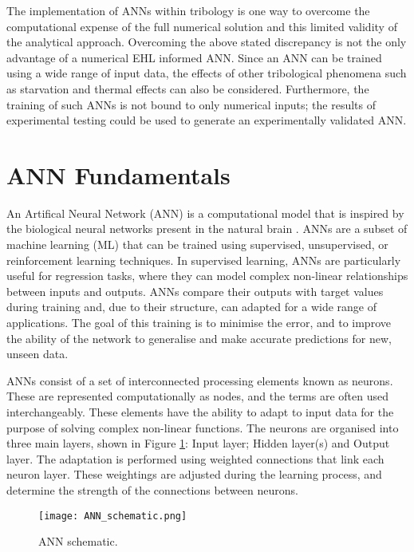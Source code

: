 The implementation of ANNs within tribology is one way to overcome the computational expense of the full numerical solution and this limited validity of the analytical approach. Overcoming the above stated discrepancy is not the only advantage of a numerical EHL informed ANN. Since an ANN can be trained using a wide range of input data, the effects of other tribological phenomena such as starvation and thermal effects can also be considered. Furthermore, the training of such ANNs is not bound to only numerical inputs; the results of experimental testing could be used to generate an experimentally validated ANN.

\section{ANN Fundamentals}

An Artifical Neural Network (ANN) is a computational model that is inspired by the biological neural networks present in the natural brain \cite{Sarkar2017}. ANNs are a subset of machine learning (ML) that can be trained using supervised, unsupervised, or reinforcement learning techniques. In supervised learning, ANNs are particularly useful for regression tasks, where they can model complex non-linear relationships between inputs and outputs. ANNs compare their outputs with target values during training and, due to their structure, can adapted for a wide range of applications. The goal of this training is to minimise the error, and to improve the ability of the network to generalise and make accurate predictions for new, unseen data.

ANNs consist of a set of interconnected processing elements known as neurons. These are represented computationally as nodes, and the terms are often used interchangeably. These elements have the ability to adapt to input data for the purpose of solving complex non-linear functions. The neurons are organised into three main layers, shown in Figure \ref{ANN schematic}: Input layer; Hidden layer(s) and Output layer. The adaptation is performed using weighted connections that link each neuron layer. These weightings are adjusted during the learning process, and determine the strength of the connections between neurons.

\begin{figure}
	\centering  
	\texttt{[image: ANN\_schematic.png]}
	\caption{ANN schematic.}
	\label{ANN schematic}
\end{figure} 

